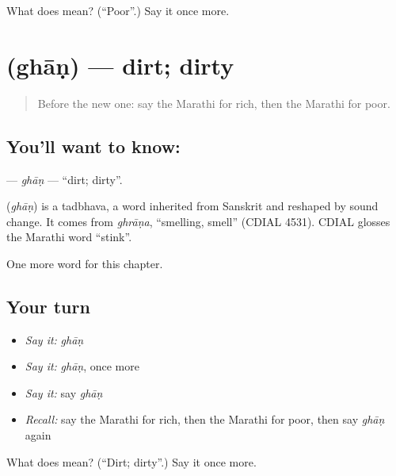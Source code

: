 \begin{tcolorbox}[breakable,colback=teal!4,colframe=teal!35!black,title={Before you move on}]
What does  mean? (\textquotedblleft{}Poor\textquotedblright{}.) Say it once more.
\end{tcolorbox}
\section[\texorpdfstring{\mr{घाण} (ghāṇ)}{घाण (ghāṇ)}]{ (ghāṇ) — dirt; dirty}

\label{lesson:MR-C105-ghan}



\begin{quote}
Before the new one: say the Marathi for rich, then the Marathi for poor.
\end{quote}

\subsection*{You'll want to know: }
\textbf{} — \emph{ghāṇ} — \textquotedblleft{}dirt; dirty\textquotedblright{}.

\begin{cousinweb}
\textbf{} (\emph{ghāṇ}) is a tadbhava, a word inherited from Sanskrit and reshaped by sound change. It comes from \emph{ghrāṇa}, \textquotedblleft{}smelling, smell\textquotedblright{} (CDIAL 4531). CDIAL glosses the Marathi word \textquotedblleft{}stink\textquotedblright{}.
\end{cousinweb}

\begin{grammarlens}[title={What you've built}]
One more word for this chapter.
\end{grammarlens}

\subsection*{Your turn}
\begin{itemize}
\raggedright
  \item \emph{Say it:} \emph{ghāṇ}
  \item \emph{Say it:} \emph{ghāṇ}, once more
  \item \emph{Say it:} say \emph{ghāṇ}
  \item \emph{Recall:} say the Marathi for rich, then the Marathi for poor, then say \emph{ghāṇ} again
\end{itemize}

\begin{tcolorbox}[breakable,colback=teal!4,colframe=teal!35!black,title={Before you move on}]
What does  mean? (\textquotedblleft{}Dirt; dirty\textquotedblright{}.) Say it once more.
\end{tcolorbox}

